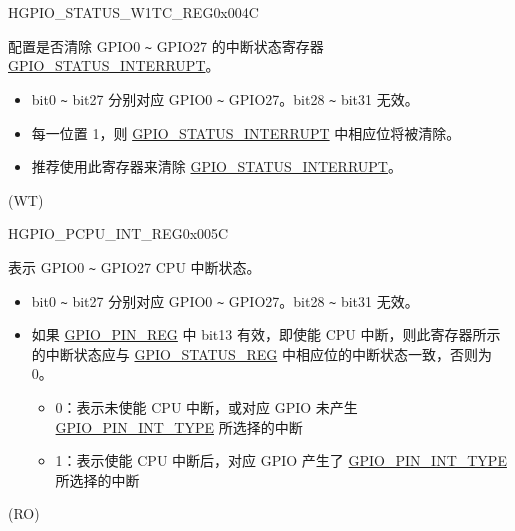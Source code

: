 \begin{register}{H}{GPIO\_STATUS\_W1TC\_REG}{0x004C}\label{regdesc:GPIOSTATUSW1TCREG}
%
\regnewline%
\begin{regdesc}\begin{reglist}
\label{fielddesc:GPIOSTATUSW1TC}\item [GPIO\_STATUS\_W1TC] 配置是否清除 GPIO0 \verb+~+ GPIO27 的中断状态寄存器 \hyperref[fielddesc:GPIOSTATUSINTERRUPT]{GPIO\_STATUS\_INTERRUPT}。
\begin{itemize}
    \item bit0 \verb+~+ bit27 分别对应 GPIO0 \verb+~+ GPIO27。bit28 \verb+~+ bit31 无效。
    \item 每一位置 1，则 \hyperref[fielddesc:GPIOSTATUSINTERRUPT]{GPIO\_STATUS\_INTERRUPT} 中相应位将被清除。
    \item 推荐使用此寄存器来清除 \hyperref[fielddesc:GPIOSTATUSINTERRUPT]{GPIO\_STATUS\_INTERRUPT}。
\end{itemize}(WT)
\end{reglist}\end{regdesc}
\end{register}

\begin{register}{H}{GPIO\_PCPU\_INT\_REG}{0x005C}\label{regdesc:GPIOPCPUINTREG}
%
\regnewline%
\begin{regdesc}\begin{reglist}
\label{fielddesc:GPIOPROCPUINT}\item [GPIO\_PROCPU\_INT] 表示 GPIO0 \verb+~+ GPIO27 CPU 中断状态。
\begin{itemize}
    \item bit0 \verb+~+ bit27 分别对应 GPIO0 \verb+~+ GPIO27。bit28 \verb+~+ bit31 无效。
    \item 如果 \hyperref[regdesc:GPIOPINNREG]{GPIO\_PIN\_REG} 中 bit13 有效，即使能 CPU 中断，则此寄存器所示的中断状态应与 \hyperref[regdesc:GPIOSTATUSREG]{GPIO\_STATUS\_REG} 中相应位的中断状态一致，否则为 0。
    \begin{itemize}
        \item 0：表示未使能 CPU 中断，或对应 GPIO 未产生 \hyperref[fielddesc:GPIOPINNINTTYPE]{GPIO\_PIN\_INT\_TYPE} 所选择的中断
        \item 1：表示使能 CPU 中断后，对应 GPIO 产生了 \hyperref[fielddesc:GPIOPINNINTTYPE]{GPIO\_PIN\_INT\_TYPE} 所选择的中断
    \end{itemize}
\end{itemize}
(RO)
\end{reglist}\end{regdesc}
\end{register}






